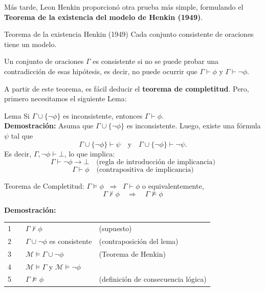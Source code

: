 Más tarde, Leon Henkin proporcionó otra prueba más simple, formulando el \textbf{Teorema de la existencia del modelo de Henkin (1949)}.

\begin{thmblock}{Teorema de la existencia Henkin (1949)}
Cada conjunto consistente de oraciones tiene un modelo.
\end{thmblock}

Un conjunto de oraciones $\Gamma$ es consistente si no se puede probar una contradicción de esas hipótesis, es decir, no puede ocurrir que $\Gamma \vdash \phi$ y $\Gamma \vdash \lnot \phi$.

A partir de este teorema, es fácil deducir el \textbf{teorema de completitud}. Pero, primero necesitamos el siguiente Lema:




\begin{exampleblock}{Lema}
Si $\Gamma \cup \{ \lnot \phi \}$ es inconsistente, entonces $\Gamma \vdash \phi$.\\

\noindent \textbf{Demostración:} Asuma que $\Gamma \cup \{ \lnot \phi \}$ es inconsistente. Luego, existe una fórmula $\psi$ tal que
\[
\Gamma \cup \{ \lnot \phi \} \vdash \psi \quad \text{y} \quad \Gamma \cup \{ \lnot \phi \} \vdash \lnot \psi.
\]
Es decir, $\Gamma , \lnot \phi \vdash \bot$, lo que implica:
\[
\Gamma \vdash \lnot \phi \rightarrow \bot \quad \text{(regla de introducción de implicancia)}
\]
\[
\Gamma \vdash \phi \quad \text{(contrapositiva de implicancia)}
\]
\end{exampleblock}


\begin{thmblock}{Teorema de Completitud:}
 $\Gamma \models \phi \;\;  \Rightarrow \;\; \Gamma \vdash \phi$ o equivalentemente,
\[
\Gamma \not \vdash \phi \quad \Rightarrow \quad \Gamma \not \models \phi
\]

\end{thmblock}
\textbf{Demostración:}\\

\begin{tabular}{p{4mm}p{4mm}p{40mm}p{40mm}}
1 & & $\Gamma \not \vdash \phi$ & (supuesto) \\
2 & & $\Gamma \cup \lnot \phi$ es consistente & (contraposición del lema) \\
3 & & $\mathcal{M} \models \Gamma \cup \lnot \phi$ & (Teorema de Henkin) \\
4 & & $\mathcal{M} \models \Gamma$ y $\mathcal{M} \models \lnot \phi$ & \\
5 & & $\Gamma \not \models \phi$ & (definición de consecuencia lógica) \\
\end{tabular}